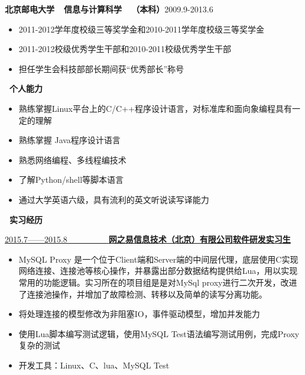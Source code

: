 \documentclass[a4paper,oneside,UTF8, winfonts]{ctexart}
\begin{document}
\indent \textbf{北京邮电大学~~信息与计算科学~~（本科）}\hfill {}2009.9-2013.6
\begin{itemize}[topsep=0.3em, leftmargin=3pc]
  \setlength{\itemsep}{0pt}
  \setlength{\parsep}{4pt}
  \setlength{\parskip}{4pt}
  \item {}2011-2012学年度校级三等奖学金和2010-2011学年度校级三等奖学金
  \item {}2011-2012校级优秀学生干部和2010-2011校级优秀学生干部
  \item {}担任学生会科技部部长期间获“优秀部长”称号
\end{itemize}
\noindent \textbf{ \heiti \faCogs\ 个人能力}
\begin{itemize}[topsep=0.3em, leftmargin=3pc]
  \setlength{\itemsep}{0pt}
  \setlength{\parsep}{4pt}
  \setlength{\parskip}{4pt}
  \item {}熟练掌握Linux平台上的C/C++程序设计语言，对标准库和面向象编程具有一定的理解
  \item {}熟练掌握 Java程序设计语言
  \item {}熟悉网络编程、多线程编技术
  \item {}了解Python/shell等脚本语言
  \item {}通过大学英语六级，具有流利的英文听说读写译能力
\end{itemize}
\noindent \textbf{ \heiti \faBriefcase\ 实习经历}\par
\vspace{1.2ex}
\uline{2015.7——2015.8~~~~~~~~~~\bf{网之易信息技术（北京）有限公司}\hfill \bf{软件研发实习生}}
\begin{itemize}[topsep=0.3em, leftmargin=3pc]
  \setlength{\itemsep}{0pt}
  \setlength{\parsep}{4pt}
  \setlength{\parskip}{4pt}
  \item {}MySQL Proxy 是一个位于Client端和Server端的中间层代理，底层使用C实现网络连接、连接池等核心操作，并暴露出部分数据结构提供给Lua，用以实现常用的功能逻辑。实习所在的项目组是是对MySql proxy进行二次开发，改进了连接池操作，并增加了故障检测、转移以及简单的读写分离功能。
  \item {}将处理连接的模型修改为非阻塞IO，事件驱动模型，增加并发能力
  \item {}使用Lua脚本编写测试逻辑，使用MySQL Test语法编写测试用例，完成Proxy复杂的测试
  \item {}开发工具：Linux、C、lua、MySQL Test
\end{itemize}\par
\end{document}
